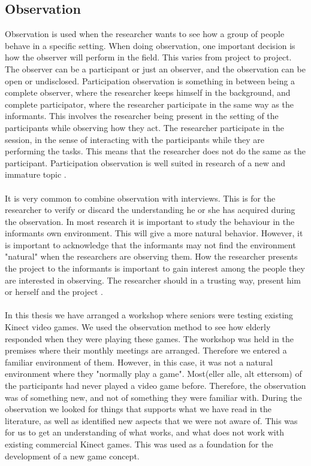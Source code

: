 \subsection{Observation}
Observation is used when the researcher wants to see how a group of people behave in a specific setting. When doing observation, one important decision is how the observer will perform in the field. This varies from project to project. The observer can be a participant or just an observer, and the observation can be open or undisclosed. Participation observation is something in between being a complete observer, where the researcher keeps himself in the background, and complete participator, where the researcher participate in the same way as the informants. This involves the researcher being present in the setting of the participants while observing how they act. The researcher participate in the session, in the sense of interacting with the participants while they are performing the tasks. This means that the researcher does not do the same as the participant. Participation observation is well suited in research of a new and immature topic \cite{qualitative}. \\ \\
It is very common to combine observation with interviews. This is for the researcher to verify or discard the understanding he or she has acquired during the observation. In most research it is important to study the behaviour in the informants own environment. This will give a more natural behavior. However, it is important to acknowledge that the informants may not find the environment "natural" when the researchers are observing them. How the researcher presents the project to the informants is important to gain interest among the people they are interested in observing. The researcher should in a trusting way, present him or herself and the project \cite{qualitative}.\\ \\
In this thesis we have arranged a workshop where seniors were testing existing Kinect video games. We used the observation method to see how elderly responded when they were playing these games. The workshop was held in the premises where their monthly meetings are arranged. Therefore we entered a familiar environment of them. However, in this case, it was not a natural environment where they "normally play a game". Most(eller alle, alt ettersom) of the participants had never played a video game before. Therefore, the observation was of something new, and not of something they were familiar with. During the observation we looked for things that supports what we have read in the literature, as well as identified new aspects that we were not aware of. This was for us to get an understanding of what works, and what does not work with existing commercial Kinect games. This was used as a foundation for the development of a new game concept. 
